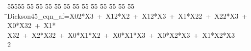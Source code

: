 %
%
\begin{tabbing}
55555 \= 55 \= 55 \= 55 \= 55 \= 55 \= 55 \= 55 \= 55 \= 55 \= 55 \= 55 \= 55 \= \>Dickson45\_eqn\_af=X02*X3\ +\ X12*X2\ +\ X12*X3\ +\ X1*X22\ +\ X22*X3\ +\ X0*X32\ +\ X1*\\[0pt]
\>X32\ +\ X2*X32\ +\ X0*X1*X2\ +\ X0*X1*X3\ +\ X0*X2*X3\ +\ X1*X2*X3\\[0pt]
2\>\end{tabbing}
